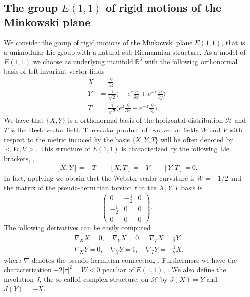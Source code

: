\documentclass[10pt]{amsart}
\theoremstyle{definition}
\theoremstyle{remark}
\numberwithin{equation}{section}
\begin{document}
\subsection{The group $E(1,1)$ of rigid motions of the Minkowski plane}
We consider the group of rigid motions of the Minkowski plane $E(1,1)$, that is a unimodular Lie group with a natural sub-Riemannian structure.  As a model of $E(1,1)$ we choose as underlying manifold ${{\mathbb{R}}}^3$ with the following orthonormal basis of left-invariant vector fields
\begin{equation}\label{def:basis}
\begin{split}
X&=\frac{\partial}{\partial z}\\
Y&=\frac{1}{\sqrt{2}}\bigg(-e^{z}\frac{\partial}{\partial x}+e^{-z}\frac{\partial}{\partial y}\bigg)\\
T&=\frac{1}{\sqrt{2}}\bigg(e^{z}\frac{\partial}{\partial x}+e^{-z}\frac{\partial}{\partial y}\bigg).
\end{split}
\end{equation} 
We have that $\{X,Y\}$ is a orthonormal basis of the horizontal distribution ${\mathcal{H}}$ and $T$ is the Reeb vector field. The scalar product of two vector fields $W$ and $V$ with respect to the metric induced by the basis $\{X,Y,T\}$ will be often denoted by ${\big<{W,V}\big>}$. This structure of $E(1,1)$ is characterized by the following Lie brackets, \cite{MR0425012},
\begin{equation}\label{liebrakets}
\begin{split}
[X,Y]=-T \qquad [X,T]=-Y \qquad [Y,T]=0.
\end{split}
\end{equation} 
In fact, applying \cite[eq.~9.1 and eq.~9.3]{MR3044134} we obtain that the Webster scalar curvature is $W=-1/2$ and the matrix of the pseudo-hermitian torsion $\tau$ in the ${X,Y,T}$ basis is 
\[
\left( \begin{array}{ccc} 
0 & -\frac{1}{2}& 0 \\
-\frac{1}{2} & 0& 0\\
0 & 0 & 0 \end{array} \right).
\] 
The following derivatives can be easily computed
\begin{equation}\label{Gchistoffel}
\begin{split}
&{\nabla}_{X}X=0, \quad  {\nabla}_{Y}X=0,  \quad    {\nabla}_{T}X=\frac{1}{2}Y,    \\
&  {\nabla}_{X}Y=0, \quad    {\nabla}_{Y}Y=0, \quad    {\nabla}_{T}Y=-\frac{1}{2}X,
\end{split}
\end{equation}
where ${\nabla}$ denotes the pseudo-hermitian connection, \cite{Dr-To}.
Furthermore we have the characterization $-2|\tau|^2=W<0$ peculiar of $E(1,1)$, \cite{Pe}. We also define the involution $J$, the so-called complex structure, on ${\mathcal{H}}$ by $J(X)=Y$ and $J(Y)=-X$.
\end{document}
